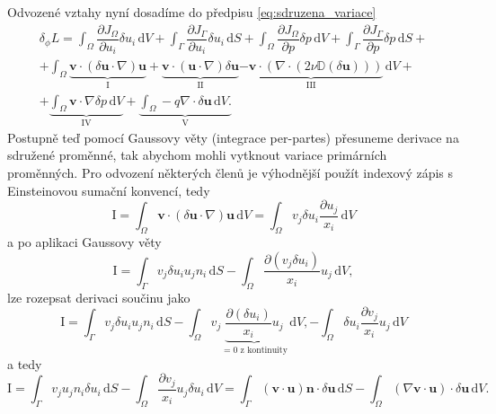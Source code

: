 Odvozené vztahy nyní dosadíme do předpisu \ref{eq:sdruzena_variace}
\begin{multline}
\delta_\phi L = 
\int_{\Omega} \dfrac{\partial J_{\Omega}}{\partial u_i} \delta u_i \, \mathrm{d}V 
+ 
\int_{\Gamma} \dfrac{\partial J_{\Gamma}}{\partial u_i} \delta u_i \, \mathrm{d}S
+
\int_{\Omega} \dfrac{\partial J_{\Omega}}{\partial p} \delta p  \, \mathrm{d}V 
+ 
\int_{\Gamma} \dfrac{\partial J_{\Gamma}}{\partial p} \delta p  \, \mathrm{d}S
+\\+
\int_{\Omega} 
		\underbrace{\mathbf{v} \cdot(\delta \mathbf{u}\cdot \nabla )\mathbf{u}}_\mathrm{I}
		+ \underbrace{\mathbf{v} \cdot(\mathbf{u}\cdot \nabla )\delta\mathbf{u}}_\mathrm{II}
		\underbrace{ - \mathbf{v} \cdot (\nabla \cdot (2\nu \mathbb{D}(\delta \mathbf{u}) ))}_\mathrm{III}
\, \mathrm{d}V
+\\+
\underbrace{
\int_{\Omega} 
 \mathbf{v} \cdot \nabla \delta p
\, \mathrm{d}V
}_\mathrm{IV}
+
\underbrace{
\int_{\Omega} 
  - q \nabla \cdot \delta \mathbf{u}
\, \mathrm{d}V.
}_\mathrm{V} 
\end{multline}
Postupně teď pomocí Gaussovy věty (integrace per-partes) přesuneme derivace na sdružené proměnné, tak abychom mohli vytknout variace primárních proměnných. Pro odvození některých členů je výhodnější použít indexový zápis s Einsteinovou sumační konvencí, tedy
\begin{equation*}
\mathrm{I}
=
\int_{\Omega} 
\mathbf{v}\cdot(\delta\mathbf{u}\cdot \nabla)\mathbf{u}
\, \mathrm{d}V
=
\int_{\Omega} 
v_j \delta u_i \frac{\partial u_j}{x_i}
\, \mathrm{d}V
\end{equation*}
a po aplikaci Gaussovy věty
\begin{equation*}
\mathrm{I}
=
\int_{\Gamma} 
v_j \delta u_i u_j n_i
\, \mathrm{d}S
-
\int_{\Omega} 
\frac{\partial( v_j \delta u_i )}{x_i}u_j
\, \mathrm{d}V,
\end{equation*}
lze rozepsat derivaci součinu jako
\begin{equation*}
\mathrm{I}
=
\int_{\Gamma} 
v_j \delta u_i u_j n_i
\, \mathrm{d}S
-
\int_{\Omega} 
v_j\underbrace{\frac{\partial( \delta u_i )}{x_i}u_j}_{=0 \text{ z kontinuity} }
\, \mathrm{d}V,
-
\int_{\Omega} 
\delta u_i \frac{\partial v_j  }{x_i}u_j
\, \mathrm{d}V
\end{equation*} 
a tedy
\begin{equation}\label{eq:clen_I}
\mathrm{I}
=
\int_{\Gamma} 
v_j u_j n_i \delta u_i 
\, \mathrm{d}S
-
\int_{\Omega} 
\frac{\partial v_j  }{x_i} u_j \delta u_i
\, \mathrm{d}V
=
\int_{\Gamma} 
(\mathbf{v}\cdot \mathbf{u} )\mathbf{n} \cdot \delta\mathbf{u}
\, \mathrm{d}S
-
\int_{\Omega} 
(\nabla \mathbf{v}\cdot \mathbf{u})\cdot\delta \mathbf{u}
\, \mathrm{d}V.
\end{equation}
